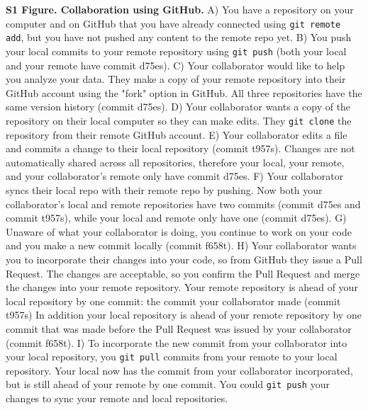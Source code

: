 \textbf{S1 Figure. Collaboration using GitHub.}
A) You have a repository on your computer and on GitHub that you have already connected using \verb|git remote add|, but you have not pushed any content to the remote repo yet.
B) You push your local commits to your remote repository using \verb|git push| (both your local and your remote have commit d75es).
C) Your collaborator would like to help you analyze your data.
They make a copy of your remote repository into their GitHub account using the "fork" option in GitHub.
All three repositories have the same version history (commit d75es).
D) Your collaborator wants a copy of the repository on their local computer so they can make edits.
They \verb|git clone| the repository from their remote GitHub account.
E) Your collaborator edits a file and commits a change to their local repository (commit t957s).
Changes are not automatically shared across all repositories, therefore your local, your remote, and your collaborator's remote only have commit d75es.
F) Your collaborator syncs their local repo with their remote repo by pushing.
Now both your collaborator's local and remote repositories have two commits (commit d75es and commit t957s), while your local and remote only have one (commit d75es).
G) Unaware of what your collaborator is doing, you continue to work on your code and you make a new commit locally (commit f658t).
H) Your collaborator wants you to incorporate their changes into your code, so from GitHub they issue a Pull Request.
The changes are acceptable, so you confirm the Pull Request and merge the changes into your remote repository.
Your remote repository is ahead of your local repository by one commit: the commit your collaborator made (commit t957s)
In addition your local repository is ahead of your remote repository by one commit that was made before the Pull Request was issued by your collaborator (commit f658t).
I) To incorporate the new commit from your collaborator into your local repository, you \verb|git pull| commits from your remote to your local repository.
Your local now has the commit from your collaborator incorporated, but is still ahead of your remote by one commit.
You could \verb|git push| your changes to sync your remote and local repositories.
